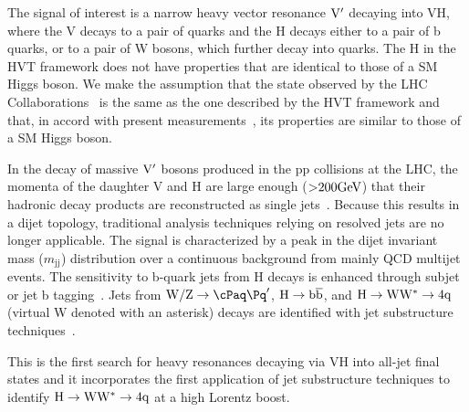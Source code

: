 The signal of interest is a narrow heavy vector resonance ${\rm V'}$ decaying into
VH, where the V decays to a pair of quarks and the H decays either to
a pair of b quarks, or to a pair of W bosons, which further decay into
quarks.
The H in the HVT framework does not have properties that are identical 
to those of a SM Higgs boson. We make the assumption that the state 
observed by the LHC Collaborations~\cite{higgsdiscoveryAtlas,Chatrchyan:2012ufa} 
is the same as the one described by the HVT framework and 
that, in accord with present 
measurements~\cite{Khachatryan:2014kcaCMSHiggs1,Khachatryan:2014jbaCMSHiggs2,AtlasHiggs1}, 
its properties are similar to those of a SM Higgs boson.
  
In the decay of massive ${\rm V'}$ bosons 
produced in the pp collisions at the LHC, 
the momenta of the daughter V and H are large enough (${>} 200\mathrm{GeV}$) 
that their hadronic decay products 
are reconstructed as single jets~\cite{Gouzevitch:2013qca}. 
Because this results in a dijet topology, 
traditional analysis techniques relying on resolved jets are 
no longer applicable. The signal is characterized by a peak 
in the dijet invariant mass ($m_\mathrm{jj}$) distribution 
over a continuous background from mainly QCD multijet 
events. The sensitivity to b-quark jets 
from H decays is enhanced through 
subjet or jet b tagging~\cite{BTV-13-001}. 
Jets from ${\rm \Vqq}$, ${\rm H\to\mathrm{b\overline{b}}}$, and ${\rm H\to{\rm W}{\rm W}^*\to4{\rm q}}$ 
(virtual W denoted with an asterisk)
decays are identified with jet 
substructure techniques~\cite{topwtag_pas,JME-13-006}.


This is the first search for heavy resonances 
decaying via VH into all-jet final states 
and it incorporates the first application of jet substructure 
techniques to identify ${\rm H\to{\rm W}{\rm W}^*\to4{\rm q}}$ at a high Lorentz boost.


